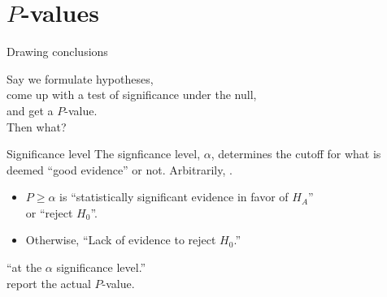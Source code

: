 \section{$P$-values}

\begin{frame}{Drawing conclusions}

  Say we formulate hypotheses, \\
  come up with a test of significance under the null,\\
  and get a $P$-value. \\
  Then what?
  
  \vspace{2em}

  \begin{block}{Significance level}
    The signficance level, $\alpha$, determines the cutoff
    for what is deemed ``good evidence'' or not.
    Arbitrarily, .
  \end{block}
  
  \vspace{2em}

  \begin{itemize}
    \item $P \ge \alpha$ is ``statistically significant evidence in favor of $H_A$'' \\
      or ``reject $H_0$''.
    \item Otherwise, ``Lack of evidence to reject $H_0$.''
  \end{itemize}
   ``at the $\alpha$ significance level.''\\
   report the actual $P$-value.


\end{frame}


